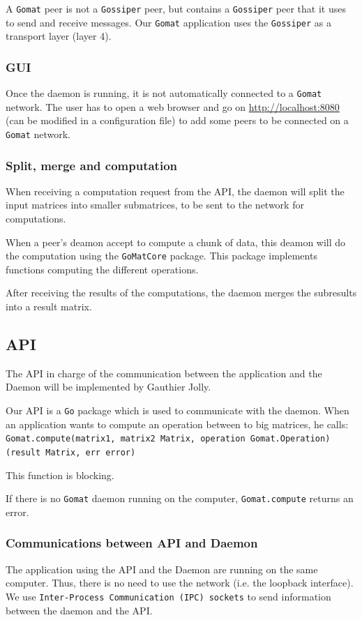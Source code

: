 \documentclass[a4paper,12pt]{article}
\newcommand{\Gossiper}{\texttt{Gossiper}\xspace}
\newcommand{\Gomat}{\texttt{Gomat}\xspace}
\newcommand{\Go}{\texttt{Go}\xspace}
\begin{document}
        A \Gomat peer is not a \Gossiper peer, but contains a \Gossiper peer that it uses to send and receive messages. Our \Gomat application uses the \Gossiper as a transport layer (layer 4).

        \subsubsection{GUI}
        Once the daemon is running, it is not automatically connected to a \Gomat network. The user has to open a web browser and go on \url{http://localhost:8080} (can be modified in a configuration file) to add some peers to be connected on a
    \Gomat network.

    \subsubsection{Split, merge and computation}
    When receiving a computation request from the API, the daemon will split the input matrices into smaller submatrices, to be sent to the network for computations.

    When a peer's deamon accept to compute a chunk of data, this deamon will do the computation using the \texttt{GoMatCore} package. This package implements functions computing the different operations.

    After receiving the results of the computations, the daemon merges the subresults into a result matrix.

    \subsection{API}
    The API in charge of the communication between the application and the Daemon will be implemented by Gauthier Jolly.

    Our API is a \Go package which is used to communicate with the daemon. When an application wants to compute an operation between to big matrices, he calls:\\
    \texttt{Gomat.compute(matrix1, matrix2 Matrix, operation Gomat.Operation)(result Matrix, err error)}


    This function is blocking.

    If there is no \Gomat daemon running on the computer, \texttt{Gomat.compute} returns an error.

        \subsubsection{Communications between API and Daemon}
    The application using the API and the Daemon are running on the same computer. Thus, there is no need to use the network (i.e. the loopback interface).
    We use \texttt{Inter-Process Communication (IPC) sockets} to send information between the daemon and the API.
\end{document}
